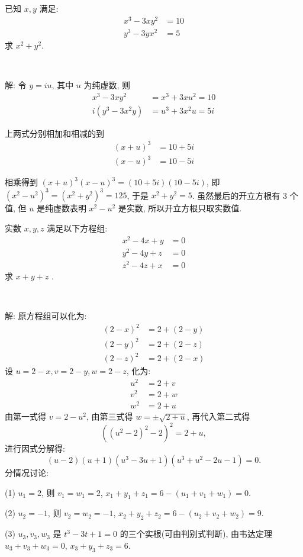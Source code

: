 已知 $x,y$ 满足:
\begin{align*}
x^3-3xy^2&=10\\
y^3-3yx^2&=5
\end{align*}
求 $x^2+y^2$.

~

解: 令 $y = iu$, 其中 $u$ 为纯虚数, 则 
\begin{align*} 
x^3-3xy^2 &= x^3+3xu^2=10\\
i(y^3-3x^2y) &= u^3+3x^2u=5i
\end{align*}

上两式分别相加和相减的到
\begin{align*}
(x+u)^3 & =10+5i\\
(x-u)^3 &= 10-5i
\end{align*}

相乘得到 $(x+u)^3(x-u)^3=(10+5i)(10-5i)$, 即 $(x^2-u^2)^3=(x^2+y^2)^3=125$, 于是 $x^2+y^2=5$. 虽然最后的开立方根有 3 个值, 但 $u$ 是纯虚数表明 $x^2-u^2$ 是实数, 所以开立方根只取实数值.


\newpage
实数 $x,y,z$ 满足以下方程组:
\begin{align*}
x^2 - 4x + y &= 0 \\
y^2 - 4y + z &= 0\\
z^2 - 4z + x &= 0
\end{align*}
求 $x+y+z$ .

~

解: 原方程组可以化为:
\begin{align*}
(2-x)^2 &= 2 + (2-y) \\
(2-y)^2 &= 2 + (2-z)\\
(2-z)^2 &= 2 + (2-x)
\end{align*}
设 $u = 2-x, v = 2-y, w = 2-z$, 化为:
\begin{align*}
u^2 &= 2 + v \\
v^2 &= 2 + w\\
w^2 &= 2 + u
\end{align*}
由第一式得 $v = 2 - u^2$, 由第三式得 $w = \pm\sqrt{2+u}$, 再代入第二式得
\[((u^2-2)^2 - 2)^2 = 2+u  ,\]
进行因式分解得:
\[(u-2)(u+1)(u^3-3u+1)(u^3+u^2-2u-1) = 0 .\]
分情况讨论:

(1) $u_1 = 2$, 则 $v_1 = w_1 = 2$, $x_1+y_1+z_1 = 6 - (u_1+v_1+w_1) = 0.$

(2) $u_2 = -1$, 则 $v_2 = w_2 = -1$, $x_2+y_2+z_2 = 6 - (u_2+v_2+w_2) = 9.$

(3) $u_3, v_3, w_3$ 是 $t^3-3t+1=0$ 的三个实根(可由判别式判断), 由韦达定理 $u_3+v_3+w_3 = 0$, $x_3+y_3+z_3 = 6$.

